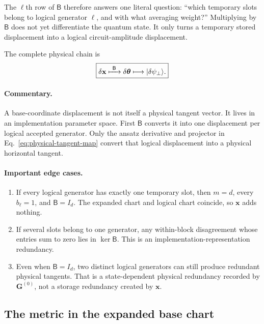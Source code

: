\documentclass[11pt]{article}
\newcommand{\ket}[1]{\lvert #1\rangle}
\newcommand{\commentary}{\paragraph{Commentary.}}
\begin{document}
The \(\ell\)th row of \(\mathsf B\) therefore answers one literal question:
``which temporary slots belong to logical generator \(\ell\), and with what
averaging weight?''  Multiplying by \(\mathsf B\) does not yet differentiate
the quantum state.  It only turns a temporary stored displacement into a
logical circuit-amplitude displacement.

The complete physical chain is
\begin{equation}
\boxed{
\delta\mathbf x
\xmapsto{\ \mathsf B\ }
\delta\boldsymbol\theta
\longmapsto
\ket{\delta\psi_\perp}.
}
\label{eq:base-to-physical}
\end{equation}

\commentary A base-coordinate displacement is not itself a physical tangent
vector.  It lives in an implementation parameter space.  First
\(\mathsf B\) converts it into one displacement per logical accepted
generator.  Only the ansatz derivative and projector in
Eq.~\eqref{eq:physical-tangent-map} convert that logical displacement into a
physical horizontal tangent.

\paragraph{Important edge cases.}
\begin{enumerate}[leftmargin=1.7em,itemsep=2pt,topsep=3pt]
\item If every logical generator has exactly one temporary slot, then
\(m=d\), every \(b_\ell=1\), and \(\mathsf B=I_d\).  The expanded chart and
logical chart coincide, so \(\mathbf x\) adds nothing.
\item If several slots belong to one generator, any within-block disagreement
whose entries sum to zero lies in \(\ker\mathsf B\).  This is an
implementation-representation redundancy.
\item Even when \(\mathsf B=I_d\), two distinct logical generators can still
produce redundant physical tangents.  That is a state-dependent physical
redundancy recorded by \(\mathbf G^{(0)}\), not a storage redundancy created
by \(\mathbf x\).
\end{enumerate}

\subsection*{The metric in the expanded base chart}
\end{document}
